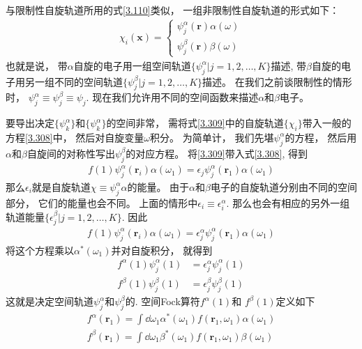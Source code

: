 与限制性自旋轨道所用的式\eqref{3.110}类似，
一组非限制性自旋轨道的形式如下：
\begin{align}
	\chi_i(\mathbf{x}) =
	\begin{cases*}
		\psi_j^\alpha(\mathbf{r})\alpha(\omega)\\
		\psi_j^\beta (\mathbf{r})\beta(\omega)
	\end{cases*}
\end{align}
也就是说，
带$\alpha$自旋的电子用一组空间轨道$\{\psi_j^\alpha |j=1,2,\ldots,K \}$描述, 
带$\beta$自旋的电子用另一组不同的空间轨道$\{\psi_j^\beta |j=1,2,\ldots,K \}$描述。
在我们之前谈限制性的情形时，
$\psi_j^\alpha \equiv \psi_j^\beta \equiv \psi_j$. 
现在我们允许用不同的空间函数来描述$\alpha$和$\beta$电子。


要导出决定$\{\psi_k^\alpha \}$和$\{\psi_k^\alpha \}$的空间非常，
需将式\eqref{3.309}中的自旋轨道$\{\chi_i\}$带入一般的\hft 方程\eqref{3.308}中，
然后对自旋变量$\omega$积分。
为简单计，
我们先堪$\psi_j^\alpha$的方程，
然后用$\alpha$和$\beta$自旋间的对称性写出$\psi_j^\beta$的对应方程。
将\eqref{3.309}带入式\eqref{3.308}, 
得到
\begin{align}
	f(1)\psi_j^\alpha(\mathbf{r}_i) \alpha(\omega_1) = \epsilon_j \psi_j^\alpha(\mathbf{r}_1) \alpha(\omega_1)
\end{align}
那么$\epsilon_i$就是自旋轨道$\chi\equiv\psi_j^\alpha\alpha$的能量。
由于$\alpha$和$\beta$电子的自旋轨道分别由不同的空间部分，
它们的能量也会不同。
上面的情形中$\epsilon_i\equiv\epsilon^\alpha_i$. 
那么也会有相应的另外一组轨道能量$\{\epsilon_j^\beta | j=1,2,\ldots,K\}$. 
因此
\begin{align}
	f(1)\psi_j^\alpha(\mathbf{r}_i) \alpha(\omega_1) = \epsilon_j^\alpha \psi_j^\alpha(\mathbf{r}_1) \alpha(\omega_1)
\end{align}
将这个方程乘以$\alpha^*(\omega_1)$并对自旋积分，
就得到
\begin{align}
	f^\alpha(1)\psi_j^\alpha(1) & = \epsilon_j^\alpha \psi_j^\alpha(1)\\
	f^\beta (1)\psi_j^\beta(1)  & = \epsilon_j^\beta \psi_j^\beta(1)
\end{align}
这就是决定空间轨道$\psi_j^\alpha$和$\psi_j^\beta$的. 
空间Fock算符$f^\alpha(1)$和 $f^\beta (1)$定义如下
\begin{align}
	f^\alpha(\mathbf{r}_1) = \int\dd\omega_1 \alpha^*(\omega_1) f(\mathbf{r}_1,\omega_1)\alpha(\omega_1)\\
	f^\beta(\mathbf{r}_1) = \int\dd\omega_1 \beta^*(\omega_1) f(\mathbf{r}_1,\omega_1)\beta(\omega_1)
\end{align}

